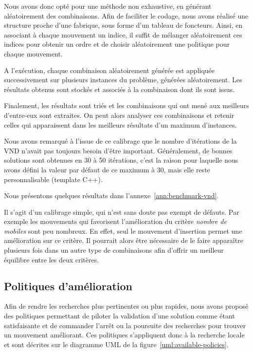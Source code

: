 				Nous avons donc opté pour une méthode non exhaustive, en générant aléatoirement des combinaisons. Afin de faciliter le codage, nous avons réalisé une structure proche d'une fabrique, sous forme d'un tableau de foncteurs. Ainsi, en associant à chaque mouvement un indice, il suffit de mélanger aléatoirement ces indices pour obtenir un ordre et de choisir aléatoirement une politique pour chaque mouvement.

				A l'exécution, chaque combinaison aléatoirement générée est appliquée successivement sur plusieurs instances du problème, générées aléatoirement. Les résultats obtenus sont stockés et associés à la combinaison dont ils sont issus.

				Finalement, les résultats sont triés et les combinaisons qui ont mené aux meilleurs d'entre-eux sont extraites. On peut alors analyser ces combinaisons et retenir celles qui apparaissent dans les meilleurs résultats d'un maximum d'instances.

				Nous avons remarqué à l'issue de ce calibrage que le nombre d'itérations de la VND n'avait pas toujours besoin d'être important. Généralement, de bonnes solutions sont obtenues en 30 à 50 itérations, c'est la raison pour laquelle nous avons défini la valeur par défaut de ce maximum à 30, mais elle reste personnalisable (template C++).

				Nous présentons quelques résultats dans l'annexe~\ref{ann:benchmark-vnd}.

				Il s'agit d'un calibrage simple, qui n'est sans doute pas exempt de défauts. Par exemple les mouvements qui favorisent l'amélioration du critère \emph{nombre de mobiles} sont peu nombreux. En effet, seul le mouvement d'insertion permet une amélioration sur ce critère. Il pourrait alors être nécessaire de le faire apparaître plusieurs fois dans un autre type de combinaisons afin d'offrir un meilleur équilibre entre les deux critères.

		\subsection{Politiques d'amélioration}
			Afin de rendre les recherches plus pertinentes ou plus rapides, nous avons proposé des politiques permettant de piloter la validation d'une solution comme étant satisfaisante et de commander l'arrêt ou la poursuite des recherches pour trouver un mouvement améliorant. Ces politiques s'appliquent donc à la recherche locale et sont décrites sur le diagramme UML de la figure~\ref{uml:available-policies}.


